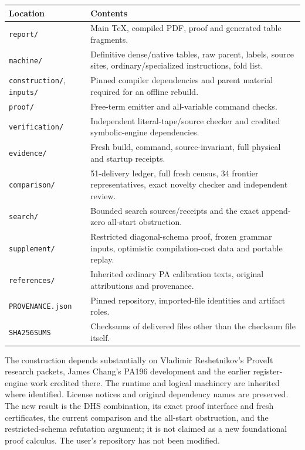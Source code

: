 \documentclass[11pt,letterpaper]{article}
\newcommand{\file}[1]{\texttt{\nolinkurl{#1}}}
\begin{document}
\begin{longtable}{@{}p{.31\linewidth}p{.62\linewidth}@{}}\toprule
Location & Contents\\\midrule\endhead
\file{report/} & Main TeX, compiled PDF, proof and generated table fragments.\\
\file{machine/} & Definitive dense/native tables, raw parent, labels, source sites, ordinary/specialized instructions, fold list.\\
\file{construction/}, \file{inputs/} & Pinned compiler dependencies and parent material required for an offline rebuild.\\
\file{proof/} & Free-term emitter and all-variable command checks.\\
\file{verification/} & Independent literal-tape/source checker and credited symbolic-engine dependencies.\\
\file{evidence/} & Fresh build, command, source-invariant, full physical and startup receipts.\\
\file{comparison/} & 51-delivery ledger, full fresh census, 34 frontier representatives, exact novelty checker and independent review.\\
\file{search/} & Bounded search sources/receipts and the exact append-zero all-start obstruction.\\
\file{supplement/} & Restricted diagonal-schema proof, frozen grammar inputs, optimistic compilation-cost data and portable replay.\\
\file{references/} & Inherited ordinary PA calibration texts, original attributions and provenance.\\
\file{PROVENANCE.json} & Pinned repository, imported-file identities and artifact roles.\\
\file{SHA256SUMS} & Checksums of delivered files other than the checksum file itself.\\\bottomrule
\end{longtable}

The construction depends substantially on Vladimir Reshetnikov's ProveIt
research packets, James Chang's PA196 development and the earlier
register-engine work credited there. The runtime and logical machinery
are inherited where identified. License notices and original dependency
names are preserved. The new result is the DHS combination, its exact
proof interface and fresh certificates, the current comparison and the
all-start obstruction, and the restricted-schema refutation argument;
it is not claimed as a new foundational proof
calculus. The user's repository has not been modified.
\end{document}
